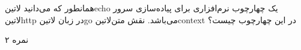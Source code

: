 \documentclass[../main.tex]{subfiles}
\begin{document}

همانطور که می‌دانید ‌لاتین{echo} یک چهارچوب نرم‌افزاری برای پیاده‌سازی سرور ‌لاتین{http} در زبان ‌لاتین{go} می‌باشد. نقش متن‌لاتین{context} در این چهارچوب چیست؟

۲ نمره
\end{document}
